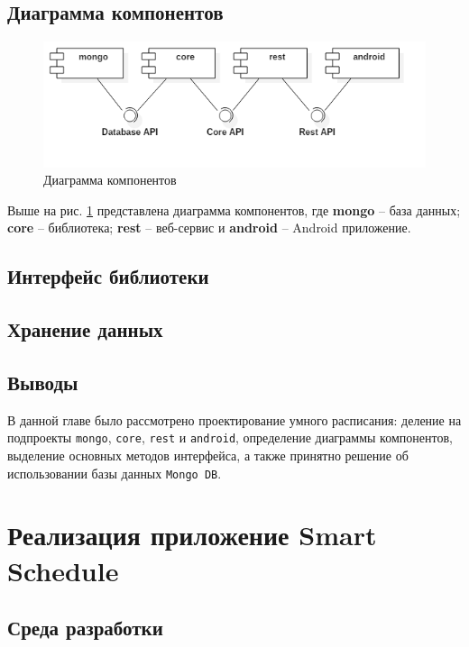 \subsection{Диаграмма компонентов}

\begin{figure}[H]
	\begin{center}
		\includegraphics[scale=0.7]{pics/components}
		\caption{Диаграмма компонентов} 
		\label{pic:component_diagram}
	\end{center}
\end{figure}

Выше на рис. \ref{pic:component_diagram} представлена диаграмма компонентов, где \textbf{mongo} -- база данных; \textbf{core} -- библиотека; \textbf{rest} -- веб-сервис и \textbf{android} -- Android приложение.

\subsection{Интерфейс библиотеки}

\subsection{Хранение данных}

\subsection{Выводы}

В данной главе было рассмотрено проектирование умного расписания: деление на подпроекты \texttt{mongo}, \texttt{core}, \texttt{rest} и \texttt{android}, определение диаграммы компонентов, выделение основных методов интерфейса, а также принятно решение об использовании базы данных \texttt{Mongo DB}.

\section{Реализация приложение Smart Schedule}

\subsection{Среда разработки}

